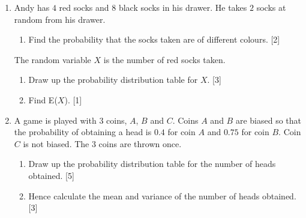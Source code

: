 \begin{enumerate}
\begin{enumerate}
	\item Draw up the probability distribution table for $X$, in terms of $k$, and find the value of $k$. \hfill[3]
	\item Find $\text{E}(x)$ and $\text{Var}(x)$. \hfill [3] 
\end{enumerate}




\item Andy has $4$ red socks and $8$ black socks in his drawer. He takes $2$ socks at random from his drawer.

\begin{enumerate}
	\item Find the probability that the socks taken are of different colours. \hfill [2]

\end{enumerate}

The random variable $X$ is the number of red socks taken.

\begin{enumerate}[resume]
	\item Draw up the probability distribution table for $X$. \hfill [3]
	\item Find E($X$). \hfill [1]
\end{enumerate}



\item  A game is played with $3$ coins, $A$, $B$ and $C$. Coins $A$ and $B$ are biased so that the probability of obtaining a head is $0.4$ for coin $A$ and $0.75$ for coin $B$. Coin $C$ is not biased. The $3$ coins are thrown once.

\begin{enumerate}
	\item Draw up the probability distribution table for the number of heads obtained. \hfill [5]
	\item Hence calculate the mean and variance of the number of heads obtained. \hfill [3]
\end{enumerate}




\end{enumerate}
